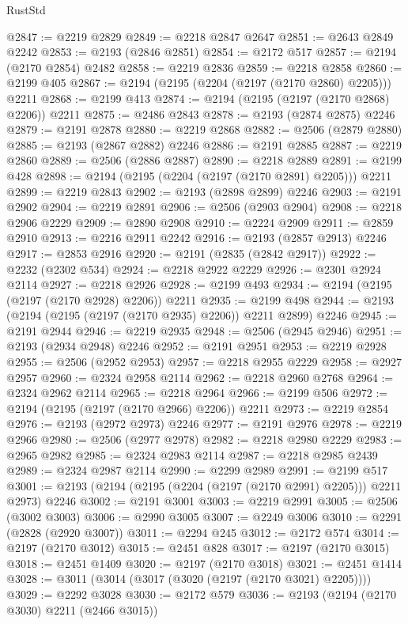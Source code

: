 \begin{lexlean}{RustStd}
\begin{coremodule}
@2847 := @2219 @2829
@2849 := @2218 @2847 @2647
@2851 := @2643 @2849 @2242
@2853 := @2193 (@2846 @2851)
@2854 := @2172 @517
@2857 := @2194 (@2170 @2854) @2482
@2858 := @2219 @2836
@2859 := @2218 @2858
@2860 := @2199 @405
@2867 := @2194 (@2195 (@2204 (@2197 (@2170 @2860) @2205))) @2211
@2868 := @2199 @413
@2874 := @2194 (@2195 (@2197 (@2170 @2868) @2206)) @2211
@2875 := @2486 @2843
@2878 := @2193 (@2874 @2875) @2246
@2879 := @2191 @2878
@2880 := @2219 @2868
@2882 := @2506 (@2879 @2880)
@2885 := @2193 (@2867 @2882) @2246
@2886 := @2191 @2885
@2887 := @2219 @2860
@2889 := @2506 (@2886 @2887)
@2890 := @2218 @2889
@2891 := @2199 @428
@2898 := @2194 (@2195 (@2204 (@2197 (@2170 @2891) @2205))) @2211
@2899 := @2219 @2843
@2902 := @2193 (@2898 @2899) @2246
@2903 := @2191 @2902
@2904 := @2219 @2891
@2906 := @2506 (@2903 @2904)
@2908 := @2218 @2906 @2229
@2909 := @2890 @2908
@2910 := @2224 @2909
@2911 := @2859 @2910
@2913 := @2216 @2911 @2242
@2916 := @2193 (@2857 @2913) @2246
@2917 := @2853 @2916
@2920 := @2191 (@2835 (@2842 @2917))
@2922 := @2232 (@2302 @534)
@2924 := @2218 @2922 @2229
@2926 := @2301 @2924 @2114
@2927 := @2218 @2926
@2928 := @2199 @493
@2934 := @2194 (@2195 (@2197 (@2170 @2928) @2206)) @2211
@2935 := @2199 @498
@2944 := @2193 (@2194 (@2195 (@2197 (@2170 @2935) @2206)) @2211 @2899) @2246
@2945 := @2191 @2944
@2946 := @2219 @2935
@2948 := @2506 (@2945 @2946)
@2951 := @2193 (@2934 @2948) @2246
@2952 := @2191 @2951
@2953 := @2219 @2928
@2955 := @2506 (@2952 @2953)
@2957 := @2218 @2955 @2229
@2958 := @2927 @2957
@2960 := @2324 @2958 @2114
@2962 := @2218 @2960 @2768
@2964 := @2324 @2962 @2114
@2965 := @2218 @2964
@2966 := @2199 @506
@2972 := @2194 (@2195 (@2197 (@2170 @2966) @2206)) @2211
@2973 := @2219 @2854
@2976 := @2193 (@2972 @2973) @2246
@2977 := @2191 @2976
@2978 := @2219 @2966
@2980 := @2506 (@2977 @2978)
@2982 := @2218 @2980 @2229
@2983 := @2965 @2982
@2985 := @2324 @2983 @2114
@2987 := @2218 @2985 @2439
@2989 := @2324 @2987 @2114
@2990 := @2299 @2989
@2991 := @2199 @517
@3001 := @2193 (@2194 (@2195 (@2204 (@2197 (@2170 @2991) @2205))) @2211 @2973) @2246
@3002 := @2191 @3001
@3003 := @2219 @2991
@3005 := @2506 (@3002 @3003)
@3006 := @2990 @3005
@3007 := @2249 @3006
@3010 := @2291 (@2828 (@2920 @3007))
@3011 := @2294 @245
@3012 := @2172 @574
@3014 := @2197 (@2170 @3012)
@3015 := @2451 @828
@3017 := @2197 (@2170 @3015)
@3018 := @2451 @1409
@3020 := @2197 (@2170 @3018)
@3021 := @2451 @1414
@3028 := @3011 (@3014 (@3017 (@3020 (@2197 (@2170 @3021) @2205))))
@3029 := @2292 @3028
@3030 := @2172 @579
@3036 := @2193 (@2194 (@2170 @3030) @2211 (@2466 @3015))

\end{coremodule}
\end{lexlean}
